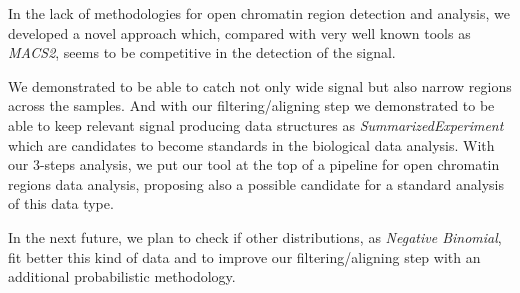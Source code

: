 In the lack of methodologies for open chromatin region detection and analysis, we developed a novel approach which, compared with very well known tools as \textit{MACS2}, seems to be competitive in the detection of the signal.

We demonstrated to be able to catch not only wide signal but also narrow regions across the samples. 
And with our filtering/aligning step we demonstrated to be able to keep relevant signal producing data structures as \textit{SummarizedExperiment} which are candidates to become standards in the biological data analysis.
With our 3-steps analysis, we put our tool at the top of a pipeline for open chromatin regions data analysis, proposing also a possible candidate for a standard analysis of this data type.

In the next future, we plan to check if other distributions, as \textit{Negative Binomial}, fit better this kind of data and to improve our filtering/aligning step with an additional probabilistic methodology.

